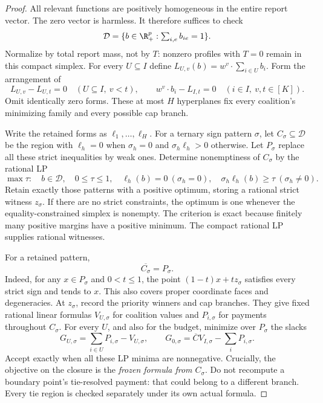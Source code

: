 \begin{proof}
All relevant functions are positively homogeneous in the entire report
vector.  The zero vector is harmless.  It therefore suffices to check
\[
 \mathcal D=\{b\in\R_+^p:\textstyle\sum_{i,e}b_{ie}=1\}.
\]
Normalize by total report mass, not by $T$: nonzero profiles with $T=0$
remain in this compact simplex.  For every $U\subseteq I$ define
$L_{U,v}(b)=w^v\cdot\sum_{i\in U}b_i$.  Form the arrangement of
\[
 L_{U,v}-L_{U,t}=0\quad(U\subseteq I,\ v<t),\qquad
 w^v\cdot b_i-L_{I,t}=0\quad(i\in I,\ v,t\in[K]).
\]
Omit identically zero forms.  These at most $H$ hyperplanes fix every
coalition's minimizing family and every possible cap branch.

Write the retained forms as $\ell_1,\ldots,\ell_H$.
For a ternary sign pattern $\sigma$, let $C_\sigma\subseteq\mathcal D$
be the region with $\ell_h=0$ when $\sigma_h=0$ and
$\sigma_h\ell_h>0$ otherwise.  Let $P_\sigma$ replace all these strict
inequalities by weak ones.  Determine nonemptiness of $C_\sigma$ by the
rational LP
\[
 \max\tau:\quad b\in\mathcal D,\quad0\le\tau\le1,\quad
 \ell_h(b)=0\ (\sigma_h=0),\quad
 \sigma_h\ell_h(b)\ge\tau\ (\sigma_h\ne0).
\]
Retain exactly those patterns with a positive optimum, storing a rational
strict witness $z_\sigma$.  If there are no strict constraints, the optimum
is one whenever the equality-constrained simplex is nonempty.
The criterion is exact because finitely many positive margins have a positive
minimum.  The compact rational LP supplies rational witnesses.

For a retained pattern,
\begin{equation}\label{alg:closure}
 \overline{C_\sigma}=P_\sigma.
\end{equation}
Indeed, for any $x\in P_\sigma$ and $0<t\le1$, the point
$(1-t)x+t z_\sigma$ satisfies every strict sign and tends to $x$.
This also covers proper coordinate faces and degeneracies.
At $z_\sigma$, record the priority winners and cap branches.  They give
fixed rational linear formulas $V_{U,\sigma}$ for coalition values and
$P_{i,\sigma}$ for payments throughout $C_\sigma$.
For every $U$, and also for the budget, minimize over $P_\sigma$ the slacks
\[
 G_{U,\sigma}=\sum_{i\in U}P_{i,\sigma}-V_{U,\sigma},\qquad
 G_{0,\sigma}=\overline C V_{I,\sigma}-\sum_iP_{i,\sigma}.
\]
Accept exactly when all these LP minima are nonnegative.
Crucially, the objective on the closure is the \emph{frozen formula from
$C_\sigma$}.  Do not recompute a boundary point's tie-resolved payment:
that could belong to a different branch.  Every tie region is checked
separately under its own actual formula.


\end{proof}
